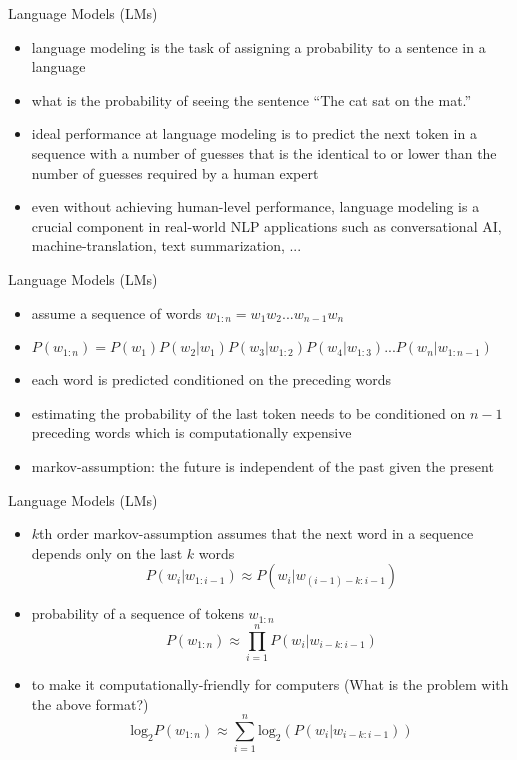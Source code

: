 \begin{frame}{Language Models (LMs)}
    \begin{itemize}
        \item<1-> language modeling is the task of assigning a probability to a sentence in a language
        \item<2-> what is the probability of seeing the sentence ``The cat sat on the mat.”
        \item<3-> ideal performance at language modeling is to predict the next token in a sequence with a number of guesses that is the identical to or lower than the number of guesses required by a human expert
        \item<4-> even without achieving human-level performance, language modeling is a crucial component in real-world NLP applications such as conversational AI, machine-translation, text summarization, ...
    \end{itemize}
\end{frame}
\begin{frame}{Language Models (LMs)}
\begin{itemize}
    \item<1-> assume a sequence of words $w_{1:n} = w_1 w_2 ... w_{n-1} w_n$
    \item<2-> $P(w_{1:n}) = P(w_1) P(w_2|w_1) P(w_3|w_{1:2})P(w_4|w_{1:3}) ... P(w_n|w_{1:n-1}) $
    \item<3-> each word is predicted conditioned on the preceding words
    \item<4-> estimating the probability of the last token needs to be conditioned on $n-1$ preceding words which is computationally expensive
    \item<5-> markov-assumption: the future is independent of the past given the present  
\end{itemize}
    
\end{frame}
\begin{frame}{Language Models (LMs)}
\begin{itemize}
    \item<1-> $k$th order markov-assumption assumes that the next word in a sequence depends only on the last $k$ words
    \begin{equation*}
        P(w_{i}|w_{1:i-1}) \approx P(w_i | w_{(i-1)-k:i-1})
    \end{equation*}
    \item<2-> probability of a sequence of tokens $w_{1:n}$
    \begin{equation*}
        P(w_{1:n}) \approx \prod_{i=1}^{n} P(w_i | w_{i-k:i-1})
    \end{equation*}
    \item<3-> to make it computationally-friendly for computers (What is the problem with the above format?)
    \begin{equation*}
        \text{log}_2P(w_{1:n}) \approx \sum_{i=1}^{n} \text{log}_2 \left(P(w_i | w_{i-k:i-1} )\right)
    \end{equation*}
\end{itemize}
\end{frame}
